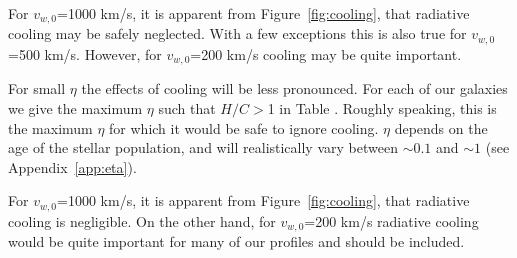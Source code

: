 \documentclass[usenatbib,fleqn]{mn2e}
\newcommand{\vwO}{v_{w,0}}
\begin{document}
For $\vwO$=1000 km/s, it is apparent from Figure~\ref{fig:cooling},
that radiative cooling may be safely neglected. With a few exceptions
this is also true for $\vwO$=500 km/s.  However, for $\vwO$=200 km/s
cooling may be quite important.

For small $\eta$ the effects of cooling will be less pronounced. For
each of our galaxies we give the maximum $\eta$ such that $H/C >$1 in
Table .  Roughly speaking, this is the maximum $\eta$ for which it
would be safe to ignore cooling. $\eta$ depends on the age of the
stellar population, and will realistically vary between $\sim 0.1$ and
$\sim 1$ (see Appendix~\ref{app:eta}).  

For $\vwO$=1000 km/s, it is apparent from Figure~\ref{fig:cooling},
that radiative cooling is negligible. On the other hand, for
$\vwO$=200 km/s radiative cooling would be quite important for many of
our profiles and should be included.


\end{document}
